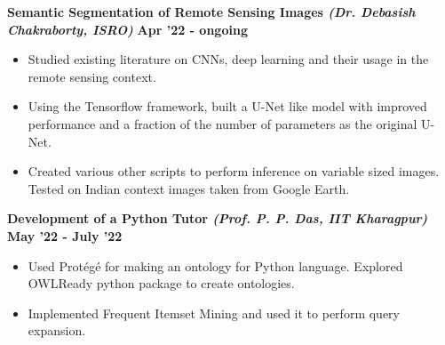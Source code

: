 \documentclass[10pt]{article}
\begin{document}

\iffalse

\fi

\vspace{-0.1ex}
{\color{headliner} \spacedhrule{0.15ex}{1.0ex}}
\large {\textbf{Semantic Segmentation of Remote Sensing Images \normalsize{\textit{(Dr. Debasish Chakraborty, ISRO)}}}} \normalsize {\href{https://github.com/rv4102/qnet.git}{\faGithub}}
{\hfill} \textbf{Apr '22 - ongoing}\\[-1.75em]
\begin{itemize}
    \item Studied existing literature on CNNs, deep learning and their usage in the remote sensing context. \\[-1.9em]
    \item Using the Tensorflow framework, built a U-Net like model with improved performance and a fraction of the number of parameters as the original U-Net. \\[-1.9em]
    \item Created various other scripts to perform inference on variable sized images. Tested on Indian context images taken from Google Earth.\\[-1.5em]
\end{itemize}
\large {\textbf{Development of a Python Tutor \normalsize{\textit{(Prof. P. P. Das, IIT Kharagpur)}}}} \normalsize
{\hfill} \textbf{May '22 - July '22}\\[-1.75em]
\begin{itemize}
    \item Used Protégé for making an ontology for Python language. Explored OWLReady python package to create ontologies.\\[-1.9em]
    \item Implemented Frequent Itemset Mining and used it to perform query expansion. \\[-1.5em]
\end{itemize}
\vspace{-2ex}
\end{document}
